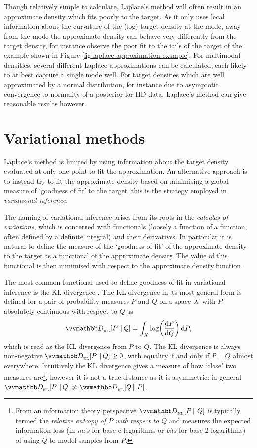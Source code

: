 Though relatively simple to calculate, Laplace's method will often result in an approximate density which fits poorly to the target. As it only uses local information about the curvature of the (log) target density at the mode, away from the mode the approximate density can behave very differently from the target density, for instance observe the poor fit to the tails of the target of the example shown in Figure \ref{fig:laplace-approximation-example}. For multimodal densities, several different Laplace approximations can be calculated, each likely to at best capture a single mode well. For target densities which are well approximated by a normal distribution, for instance due to asymptotic convergence to normality of a posterior for \ac{IID} data, Laplace's method can give reasonable results however. 

\section{Variational methods}\label{sec:variational-methods}

Laplace's method is limited by using information about the target density evaluated at only one point to fit the approximation. An alternative approach is to instead try to fit the approximate density based on minimising a global measure of `goodness of fit' to the target; this is the strategy employed in \emph{variational inference}.

The naming of variational inference arises from its roots in the \emph{calculus of variations}, which is concerned with functionals (loosely a function of a function, often defined by a definite integral) and their derivatives. In particular it is natural to define the measure of the `goodness of fit' of the approximate density to the target as a functional of the approximate density. The value of this functional is then minimised with respect to the approximate density function. 

The most common functional used to define goodness of fit in variational inference is the \ac{KL} divergence \citep{kullback1951information}. The \ac{KL} divergence in its most general form is defined for a pair of probability measures $P$ and $Q$ on a space $\mathit{X}$ with $P$ absolutely continuous with respect to $Q$ as
\begin{equation}\label{eq:kullback-leibler-probability-measures}
  \kldiv{P}{Q} =
  \int_{\set{X}} \log\lpa\td{P}{Q}\rpa \,\dr P,
\end{equation}
which is read as the \ac{KL} divergence from $P$ to $Q$. The \ac{KL} divergence is always non-negative $\kldiv{P}{Q} \geq 0$, with equality if and only if $P = Q$ almost everywhere. Intuitively the \ac{KL} divergence gives a measure of how `close' two measures are\footnote{From an information theory perspective $\kldiv{P}{Q}$ is typically termed the \emph{relative entropy of $P$ with respect to $Q$} and measures the expected information loss (in \emph{nats} for base-$\mathrm{e}$ logarithms or \emph{bits} for base-2 logarithms) of using $Q$ to model samples from $P$.}, however it is not a true distance as it is asymmetric: in general $\kldiv{P}{Q} \neq \kldiv{Q}{P}$.

